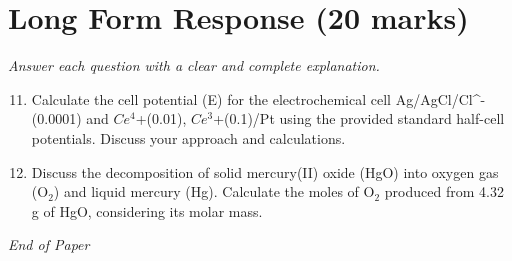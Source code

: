 \documentclass[12pt]{article}
\begin{document}
\section*{Long Form Response (20 marks)}
\textit{Answer each question with a clear and complete explanation.}
\begin{enumerate}[label=\arabic*.]
\setcounter{enumi}{10}
\item Calculate the cell potential (E) for the electrochemical cell Ag/AgCl/Cl^-(0.0001) and $Ce^4$+(0.01), $Ce^3$+(0.1)/Pt using the provided standard half-cell potentials. Discuss your approach and calculations.
\item Discuss the decomposition of solid mercury(II) oxide (HgO) into oxygen gas (O$_{2}$) and liquid mercury (Hg). Calculate the moles of O$_{2}$ produced from 4.32 g of HgO, considering its molar mass.
\end{enumerate}

\vfill
\noindent\textit{End of Paper}
\end{document}
